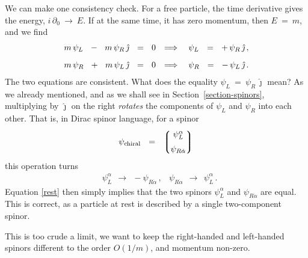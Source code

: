 \documentclass[epsfig,12pt]{article}
\newcommand{\p}{\partial}
\newcommand{\lgr}{\left\lgroup}
\newcommand{\rgr}{\right\rgroup}
\newcommand{\jj}{\hat\jmath}
\begin{document}
	We can make one consistency check.
	For a free particle, the time derivative gives the energy,
	$ i\,\p_0 ~\to~ E $.
	If at the same time, it has zero momentum, then $ E ~=~ m $, and
	we find
\begin{align}
%
\notag
	&
	m\,\psi_L  ~~-~~  m\,\psi_R\,\jj	~~=~~	0
	&
	\Longrightarrow\quad \psi_L	~~=~~	+\,\psi_R\,\jj\,,
	\\[2mm]
%
\label{rest}
	&
	m\,\psi_R  ~~+~~  m\,\psi_L\,\jj	~~=~~	0
	&
	\Longrightarrow\quad \psi_R	~~=~~	-\,\psi_L\,\jj\,.
\end{align}
	The two equations are consistent.
	What does the equality $ \psi_L ~=~ \psi_R\,\jj $ mean?
	As we already mentioned, and as we shall see in Section~\ref{section-spinors},
	multiplying by $ \jj $ on the right
	\emph{rotates} the components of $ \psi_L $ and $ \psi_R $ into
	each other.
	That is, in Dirac spinor language, for a spinor
\begin{equation}
	\psi_\text{chiral}	~~=~~	\lgr 
						\begin{matrix}
							\psi_L^\alpha	\\[2mm]
							\psi_{R\dot\alpha}
						\end{matrix}
					\rgr
\end{equation}
	this operation turns
\begin{align}
	&
	\psi_L^\alpha	~~\to~~		-\psi_{R\dot\alpha}\,,
	&
	\psi_{R\dot\alpha}	~~\to~~		\psi_L^\alpha\,.
\end{align}
	Equation \eqref{rest} then simply implies that the two spinors
	$ \psi_L^\alpha $ and $ \psi_{R\dot\alpha} $ are equal.
	This is correct, as a particle at rest is described by a single
	two-component spinor.

	This is too crude a limit, we want to keep the right-handed and left-handed
	spinors different to the order $ O(1/m) $, and momentum non-zero.
	
\end{document}
